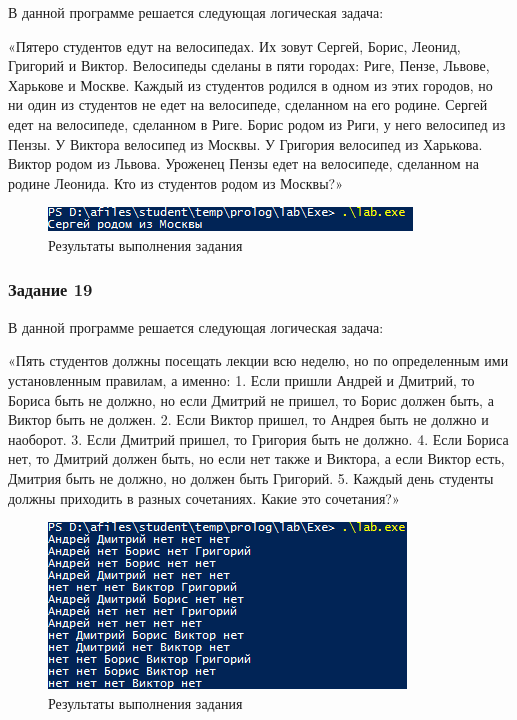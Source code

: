 \documentclass[14pt,a4paper,report]{report}
\begin{document}
В данной программе решается следующая логическая задача:

«Пятеро студентов едут на велосипедах. Их зовут Сергей, Борис, Леонид, Григорий и Виктор. Велосипеды сделаны в пяти городах: Риге, Пензе, Львове, Харькове и Москве. Каждый из студентов родился в одном из этих городов, но ни один из студентов не едет на велосипеде, сделанном на его родине. Сергей едет на велосипеде, сделанном в Риге. Борис родом из Риги, у него велосипед из Пензы. У Виктора велосипед из Москвы. У Григория велосипед из Харькова. Виктор родом из Львова. Уроженец Пензы едет на велосипеде, сделанном на родине Леонида. Кто из студентов родом из Москвы?»



\begin{figure}[h!]
	\centering
	\includegraphics[scale = 1.0]{images/d18.png}
	\caption{Результаты выполнения задания}
\end{figure}

\subsubsection{Задание 19}

В данной программе решается следующая логическая задача:

«Пять студентов должны посещать лекции всю неделю, но по определенным ими установленным правилам, а именно:
1. Если пришли Андрей и Дмитрий, то Бориса быть не должно, но если Дмитрий не пришел, то Борис должен быть, а Виктор быть не должен.
2. Если Виктор пришел, то Андрея быть не должно и наоборот.
3. Если Дмитрий пришел, то Григория быть не должно.
4. Если Бориса нет, то Дмитрий должен быть, но если нет также и Виктора, а если Виктор есть, Дмитрия быть не должно, но должен быть Григорий.
5. Каждый день студенты должны приходить в разных сочетаниях.
Какие это сочетания?»



\begin{figure}[h!]
	\centering
	\includegraphics[scale = 1.0]{images/d19.png}
	\caption{Результаты выполнения задания}
\end{figure}
\end{document}
